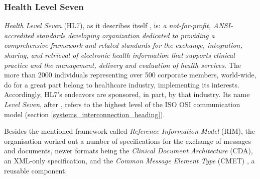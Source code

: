 %
%
%
%
%
%
%

\subsubsection{Health Level Seven}
\label{health_level_seven_heading}

\emph{Health Level Seven} (HL7), as it describes itself \cite{hl7}, is:
\textit{a not-for-profit, ANSI-accredited standards developing organization
dedicated to providing a comprehensive framework and related standards for the
exchange, integration, sharing, and retrieval of electronic health information
that supports clinical practice and the management, delivery and evaluation of
health services.} The more than 2000 individuals representing over 500
corporate members, world-wide, do for a great part belong to healthcare
industry, implementing its interests. Accordingly, HL7's endeavors are
sponsored, in part, by that industry. Its name \emph{Level Seven}, after
\cite{rogers}, refers to the highest level of the ISO OSI communication model
(section \ref{systems_interconnection_heading}).

Besides the mentioned framework called \emph{Reference Information Model} (RIM),
the organisation worked out a number of specifications for the exchange of messages
and documents, newer formats being the \emph{Clinical Document Architecture} (CDA),
an XML-only specification, and the \emph{Common Message Element Type} (CMET)
\cite{marley}, a reusable component.

